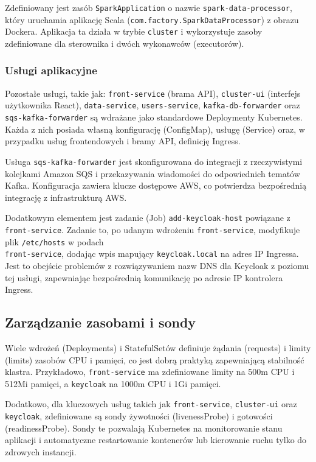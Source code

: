 Zdefiniowany jest zasób \texttt{SparkApplication} o nazwie \texttt{spark-data-processor}, który uruchamia aplikację Scala (\texttt{com.factory.SparkDataProcessor}) z obrazu Dockera. Aplikacja ta działa w trybie \texttt{cluster} i wykorzystuje zasoby zdefiniowane dla sterownika i dwóch wykonawców (executorów).

\subsubsection{Usługi aplikacyjne}
Pozostałe usługi, takie jak: \texttt{front-service} (brama API), \texttt{cluster-ui} (interfejs użytkownika React), \texttt{data-service}, \texttt{users-service}, \texttt{kafka-db-forwarder} oraz \texttt{sqs-kafka-forwarder} są wdrażane jako standardowe Deploymenty Kubernetes. Każda z nich posiada własną konfigurację (ConfigMap), usługę (Service) oraz, w przypadku usług frontendowych i bramy API, definicję Ingress.

Usługa \texttt{sqs-kafka-forwarder} jest skonfigurowana do integracji z rzeczywistymi kolejkami Amazon SQS i przekazywania wiadomości do odpowiednich tematów Kafka. Konfiguracja zawiera klucze dostępowe AWS, co potwierdza bezpośrednią integrację z infrastrukturą AWS.

Dodatkowym elementem jest zadanie (Job) \texttt{add-keycloak-host} powiązane z \texttt{front-service}. Zadanie to, po udanym wdrożeniu \texttt{front-service}, modyfikuje plik \texttt{/etc/hosts} w podach \\ \texttt{front-service}, dodając wpis mapujący \texttt{keycloak.local} na adres IP Ingressa. Jest to obejście problemów z rozwiązywaniem nazw DNS dla Keycloak z poziomu tej usługi, zapewniając bezpośrednią komunikację po adresie IP kontrolera Ingress.

\subsection{Zarządzanie zasobami i sondy}

Wiele wdrożeń (Deployments) i StatefulSetów definiuje żądania (requests) i limity (limits) zasobów CPU i pamięci, co jest dobrą praktyką zapewniającą stabilność klastra. Przykładowo, \texttt{front-service} ma zdefiniowane limity na 500m CPU i 512Mi pamięci, a \texttt{keycloak} na 1000m CPU i 1Gi pamięci.

Dodatkowo, dla kluczowych usług takich jak \texttt{front-service}, \texttt{cluster-ui} oraz \texttt{keycloak}, zdefiniowane są sondy żywotności (livenessProbe) i gotowości (readinessProbe). Sondy te pozwalają Kubernetes na monitorowanie stanu aplikacji i automatyczne restartowanie kontenerów lub kierowanie ruchu tylko do zdrowych instancji.
